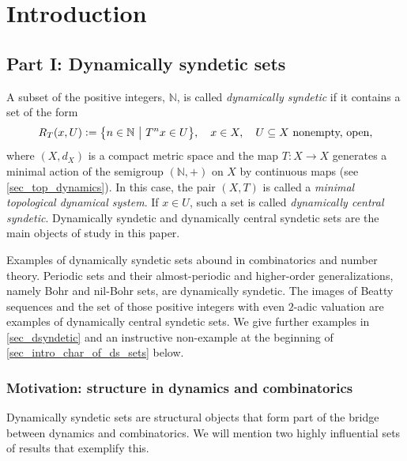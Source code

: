 \documentclass[letter,11pt]{article}
\theoremstyle{plain}
\theoremstyle{definition}
\theoremstyle{plain}
\theoremstyle{plain}
\numberwithin{equation}{section}
\newcommand{\N}{\mathbb{N}}
\newcommand{\defeq}{\vcentcolon=}
\begin{document}
\newpage

\setcounter{tocdepth}{2}
\tableofcontents


\section{Introduction}

\subsection{Part I: Dynamically syndetic sets}
\label{sec_part_one_intro}

A subset of the positive integers, $\N$, is called \emph{dynamically syndetic} if it contains a set of the form
\[R_T(x,U) \defeq \big\{ n \in \N \ \big| \ T^n x \in U \big\}, \quad x \in X, \quad U \subseteq X \text{ nonempty, open},\]
where $(X,d_X)$ is a compact metric space and the map $T: X \to X$ generates a minimal action of the semigroup $(\N,+)$ on $X$ by continuous maps (see \cref{sec_top_dynamics}). In this case, the pair $(X,T)$ is called a \emph{minimal topological dynamical system}.  If $x \in U$, such a set is called \emph{dynamically central syndetic}.  Dynamically syndetic and dynamically central syndetic sets are the main objects of study in this paper.


Examples of dynamically syndetic sets abound in combinatorics and number theory.  Periodic sets and their almost-periodic and higher-order generalizations, namely Bohr and nil-Bohr sets, are dynamically syndetic.  The images of Beatty sequences and the set of those positive integers with even $2$-adic valuation are examples of dynamically central syndetic sets. We give further examples in \cref{sec_dsyndetic} and an instructive non-example at the beginning of \cref{sec_intro_char_of_ds_sets} below.



\subsubsection{Motivation: structure in dynamics and combinatorics}

Dynamically syndetic sets are structural objects that form part of the bridge between dynamics and combinatorics.  We will mention two highly influential sets of results that exemplify this.
\end{document}
